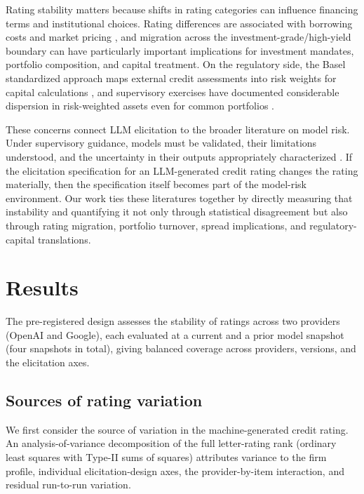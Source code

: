 \documentclass[pdflatex,sn-nature,lineno]{sn-jnl}
\theoremstyle{thmstyleone}
\begin{document}
Rating stability matters because shifts in rating categories can influence financing terms and
institutional choices. Rating differences are associated with borrowing costs and
market pricing \cite{kligersarig2000,tang2009,cornaggia2018}, and migration across the
investment-grade/high-yield boundary can have particularly important implications for investment
mandates, portfolio composition, and capital treatment. On the regulatory side, the Basel standardized
approach maps external credit assessments into risk weights for capital calculations
\cite{bcbs2019cre20}, and supervisory exercises have documented considerable dispersion in risk-weighted
assets even for common portfolios \cite{bcbs2013rcap}.

These concerns connect LLM elicitation to the broader literature on model risk. Under supervisory
guidance, models must be validated, their limitations understood, and the uncertainty in their outputs
appropriately characterized \cite{srletter2011}. If the elicitation specification for an LLM-generated
credit rating changes the rating materially, then the specification itself becomes part of the model-risk
environment. Our work ties these literatures together by directly measuring that instability and
quantifying it not only through statistical disagreement but also through rating migration, portfolio
turnover, spread implications, and regulatory-capital translations.

\section{Results}
The pre-registered design assesses the stability of ratings across two providers (OpenAI and Google),
each evaluated at a current and a prior model snapshot (four snapshots in total), giving balanced coverage
across providers, versions, and the elicitation axes.

\subsection{Sources of rating variation}
We first consider the source of variation in the machine-generated credit rating. An
analysis-of-variance decomposition of the full letter-rating rank (ordinary least squares with Type-II
sums of squares) attributes variance to the firm profile, individual elicitation-design axes, the
provider-by-item interaction, and residual run-to-run variation.
\end{document}

